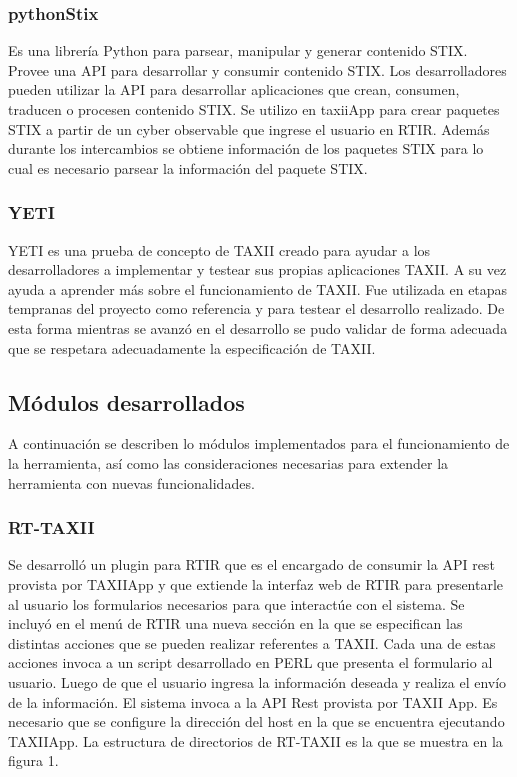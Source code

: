 \documentclass[11pt]{article}
\begin{document}
\subsubsection{pythonStix}
Es una librería Python para parsear, manipular y generar contenido STIX. Provee una API para desarrollar y consumir contenido STIX. Los desarrolladores pueden utilizar la API para desarrollar aplicaciones que crean, consumen, traducen o procesen contenido STIX.
Se utilizo en taxiiApp para crear paquetes STIX a partir de un cyber observable que ingrese el usuario en RTIR. Además durante los intercambios se obtiene información de los paquetes STIX para lo cual es necesario parsear la información del paquete STIX. 

\subsubsection{YETI}
YETI es una prueba de concepto de TAXII creado para ayudar a los desarrolladores a implementar y testear sus propias aplicaciones TAXII. A su vez ayuda a aprender más sobre el funcionamiento de TAXII.
Fue utilizada en etapas tempranas del proyecto como referencia y para testear el desarrollo realizado. De esta forma mientras se avanzó en el desarrollo se pudo validar de forma adecuada que se respetara adecuadamente la especificación de TAXII.

\subsection{Módulos desarrollados}
A continuación se describen lo módulos implementados para el funcionamiento de la herramienta, así como las consideraciones necesarias para extender la herramienta con nuevas funcionalidades.

\subsubsection{RT-TAXII}
Se desarrolló un plugin para RTIR que es el encargado de consumir la API rest provista por TAXIIApp y que extiende la interfaz web de RTIR para presentarle al usuario los formularios necesarios para que interactúe con el sistema.
Se incluyó en el menú de RTIR una nueva sección en la que se especifican las distintas acciones que se pueden realizar referentes a TAXII.
Cada una de estas acciones invoca a un script desarrollado en PERL que presenta el formulario al usuario.
Luego de que el usuario ingresa la información deseada y realiza el envío de la información. El sistema invoca a la API Rest provista por TAXII App.
Es necesario que se configure la dirección del host en la que se encuentra ejecutando TAXIIApp.
La estructura de directorios de RT-TAXII es la que se muestra en la figura 1.\\
\end{document}
